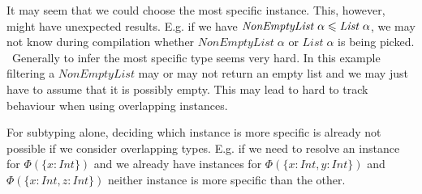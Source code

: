 


It may seem that we could choose the most specific instance. This, however, might have unexpected results.
E.g. if we have $\mathit{NonEmptyList} \; \alpha \leqslant \mathit{List} \; \alpha$, we may not know during compilation whether $\mathit{NonEmptyList} \; \alpha $ or $\mathit{List} \; \alpha$ is being picked.
~Generally to infer the most specific type seems very hard. In this example filtering a $\mathit{NonEmptyList}$ may or may not return an empty list and we may just have to assume that it is possibly empty.
This may lead to hard to track behaviour when using overlapping instances.

For subtyping alone, deciding which instance is more specific is already not possible if we consider overlapping types.
E.g. if we need to resolve an instance for $\Phi (\{x : Int\})$ and we already have instances for $\Phi (\{x : Int, y : Int\})$ and $\Phi (\{x : Int, z : Int\})$ neither instance is more specific than the other.




